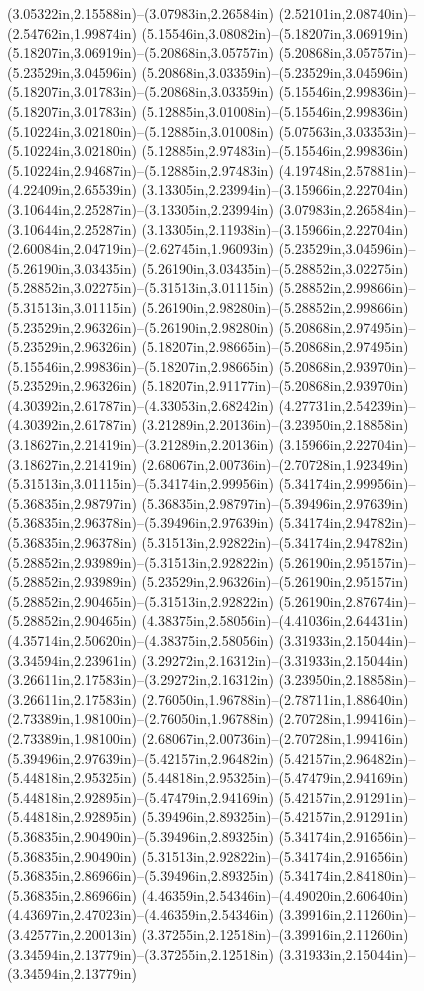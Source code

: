 (3.05322in,2.15588in)--(3.07983in,2.26584in) (2.52101in,2.08740in)--(2.54762in,1.99874in) (5.15546in,3.08082in)--(5.18207in,3.06919in) (5.18207in,3.06919in)--(5.20868in,3.05757in) (5.20868in,3.05757in)--(5.23529in,3.04596in) (5.20868in,3.03359in)--(5.23529in,3.04596in) (5.18207in,3.01783in)--(5.20868in,3.03359in) (5.15546in,2.99836in)--(5.18207in,3.01783in) (5.12885in,3.01008in)--(5.15546in,2.99836in) (5.10224in,3.02180in)--(5.12885in,3.01008in) (5.07563in,3.03353in)--(5.10224in,3.02180in) (5.12885in,2.97483in)--(5.15546in,2.99836in) (5.10224in,2.94687in)--(5.12885in,2.97483in) (4.19748in,2.57881in)--(4.22409in,2.65539in) (3.13305in,2.23994in)--(3.15966in,2.22704in) (3.10644in,2.25287in)--(3.13305in,2.23994in) (3.07983in,2.26584in)--(3.10644in,2.25287in) (3.13305in,2.11938in)--(3.15966in,2.22704in) (2.60084in,2.04719in)--(2.62745in,1.96093in) (5.23529in,3.04596in)--(5.26190in,3.03435in) (5.26190in,3.03435in)--(5.28852in,3.02275in) (5.28852in,3.02275in)--(5.31513in,3.01115in) (5.28852in,2.99866in)--(5.31513in,3.01115in) (5.26190in,2.98280in)--(5.28852in,2.99866in) (5.23529in,2.96326in)--(5.26190in,2.98280in) (5.20868in,2.97495in)--(5.23529in,2.96326in) (5.18207in,2.98665in)--(5.20868in,2.97495in) (5.15546in,2.99836in)--(5.18207in,2.98665in) (5.20868in,2.93970in)--(5.23529in,2.96326in) (5.18207in,2.91177in)--(5.20868in,2.93970in) (4.30392in,2.61787in)--(4.33053in,2.68242in) (4.27731in,2.54239in)--(4.30392in,2.61787in) (3.21289in,2.20136in)--(3.23950in,2.18858in) (3.18627in,2.21419in)--(3.21289in,2.20136in) (3.15966in,2.22704in)--(3.18627in,2.21419in) (2.68067in,2.00736in)--(2.70728in,1.92349in) (5.31513in,3.01115in)--(5.34174in,2.99956in) (5.34174in,2.99956in)--(5.36835in,2.98797in) (5.36835in,2.98797in)--(5.39496in,2.97639in) (5.36835in,2.96378in)--(5.39496in,2.97639in) (5.34174in,2.94782in)--(5.36835in,2.96378in) (5.31513in,2.92822in)--(5.34174in,2.94782in) (5.28852in,2.93989in)--(5.31513in,2.92822in) (5.26190in,2.95157in)--(5.28852in,2.93989in) (5.23529in,2.96326in)--(5.26190in,2.95157in) (5.28852in,2.90465in)--(5.31513in,2.92822in) (5.26190in,2.87674in)--(5.28852in,2.90465in) (4.38375in,2.58056in)--(4.41036in,2.64431in) (4.35714in,2.50620in)--(4.38375in,2.58056in) (3.31933in,2.15044in)--(3.34594in,2.23961in) (3.29272in,2.16312in)--(3.31933in,2.15044in) (3.26611in,2.17583in)--(3.29272in,2.16312in) (3.23950in,2.18858in)--(3.26611in,2.17583in) (2.76050in,1.96788in)--(2.78711in,1.88640in) (2.73389in,1.98100in)--(2.76050in,1.96788in) (2.70728in,1.99416in)--(2.73389in,1.98100in) (2.68067in,2.00736in)--(2.70728in,1.99416in) (5.39496in,2.97639in)--(5.42157in,2.96482in) (5.42157in,2.96482in)--(5.44818in,2.95325in) (5.44818in,2.95325in)--(5.47479in,2.94169in) (5.44818in,2.92895in)--(5.47479in,2.94169in) (5.42157in,2.91291in)--(5.44818in,2.92895in) (5.39496in,2.89325in)--(5.42157in,2.91291in) (5.36835in,2.90490in)--(5.39496in,2.89325in) (5.34174in,2.91656in)--(5.36835in,2.90490in) (5.31513in,2.92822in)--(5.34174in,2.91656in) (5.36835in,2.86966in)--(5.39496in,2.89325in) (5.34174in,2.84180in)--(5.36835in,2.86966in) (4.46359in,2.54346in)--(4.49020in,2.60640in) (4.43697in,2.47023in)--(4.46359in,2.54346in) (3.39916in,2.11260in)--(3.42577in,2.20013in) (3.37255in,2.12518in)--(3.39916in,2.11260in) (3.34594in,2.13779in)--(3.37255in,2.12518in) (3.31933in,2.15044in)--(3.34594in,2.13779in) 